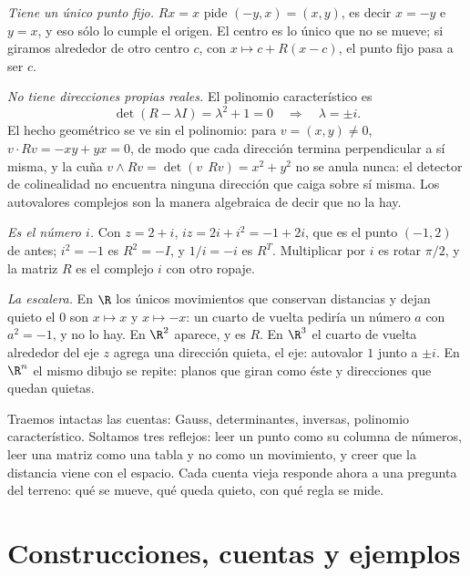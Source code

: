 \emph{Tiene un único punto fijo.} \(Rx=x\) pide \((-y,x)=(x,y)\), es decir \(x=-y\) e
\(y=x\), y eso sólo lo cumple el origen. El centro es lo único que no se mueve; si giramos
alrededor de otro centro \(c\), con \(x\mapsto c+R(x-c)\), el punto fijo pasa a ser \(c\).

\emph{No tiene direcciones propias reales.} El polinomio característico es
\[
  \det(R-\lambda I)=\lambda^2+1=0\quad\Longrightarrow\quad\lambda=\pm i .
\]
El hecho geométrico se ve sin el polinomio: para \(v=(x,y)\neq0\), \(v\cdot Rv=-xy+yx=0\),
de modo que cada dirección termina perpendicular a sí misma, y la cuña
\(v\wedge Rv=\det(v\ \ Rv)=x^2+y^2\) no se anula nunca: el detector de colinealidad no
encuentra ninguna dirección que caiga sobre sí misma. Los autovalores complejos son la
manera algebraica de decir que no la hay.

\emph{Es el número \(i\).} Con \(z=2+i\), \(iz=2i+i^2=-1+2i\), que es el punto \((-1,2)\) de
antes; \(i^2=-1\) es \(R^2=-I\), y \(1/i=-i\) es \(R^T\). Multiplicar por \(i\) es rotar
\(\pi/2\), y la matriz \(R\) es el complejo \(i\) con otro ropaje.

\emph{La escalera.} En \(\R\) los únicos movimientos que conservan distancias y dejan quieto
el \(0\) son \(x\mapsto x\) y \(x\mapsto-x\): un cuarto de vuelta pediría un número \(a\)
con \(a^2=-1\), y no lo hay. En \(\R^2\) aparece, y es \(R\). En \(\R^3\) el cuarto de vuelta
alrededor del eje \(z\) agrega una dirección quieta, el eje: autovalor \(1\) junto a
\(\pm i\). En \(\R^n\) el mismo dibujo se repite: planos que giran como éste y direcciones
que quedan quietas.

\begin{idea}
Traemos intactas las cuentas: Gauss, determinantes, inversas, polinomio característico.
Soltamos tres reflejos: leer un punto como su columna de números, leer una matriz como una
tabla y no como un movimiento, y creer que la distancia viene con el espacio. Cada cuenta
vieja responde ahora a una pregunta del terreno: qué se mueve, qué queda quieto, con qué
regla se mide.
\end{idea}

{\small\vspace{1mm}\par}

\section{Construcciones, cuentas y ejemplos}

